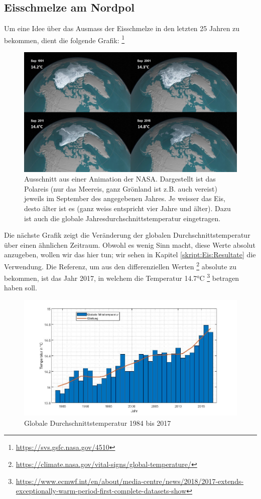 \begin{refsection}
\subsection{Eisschmelze am Nordpol}
Um eine Idee über das Ausmass der Eisschmelze in den letzten 25 Jahren zu bekommen, dient die folgende Grafik:%
	\footnote{\url{https://svs.gsfc.nasa.gov/4510}}
\begin{figure}[H]
	\centering
	\includegraphics[width=14cm]{eis/NASA_ohne_Breitengraden.jpg}
	\caption{Ausschnitt aus einer Animation der NASA. Dargestellt ist das Polareis (nur das Meereis, ganz Grönland ist z.B. auch vereist) jeweils im September des angegebenen Jahres. Je weisser das Eis, desto älter ist es (ganz weiss entspricht vier Jahre und älter).	Dazu ist auch die globale Jahresdurchschnittstemperatur eingetragen.}
	\label{skript:eis:fig:NASAohne}
\end{figure}
Die nächste Grafik zeigt die Veränderung der globalen Durchschnittstemperatur über einen ähnlichen Zeitraum. Obwohl es wenig Sinn macht, diese Werte absolut anzugeben, wollen wir das hier tun; wir sehen in Kapitel \ref{skript:Eis:Resultate} die Verwendung. Die Referenz, um aus den differenziellen Werten \footnote{\url{https://climate.nasa.gov/vital-signs/global-temperature/}} absolute zu bekommen, ist das Jahr 2017, in welchem die Temperatur 14.7°C
\footnote{\url{https://www.ecmwf.int/en/about/media-centre/news/2018/2017-extends-exceptionally-warm-period-first-complete-datasets-show}} betragen haben soll.
\begin{figure}[H]
	\centering
	\includegraphics[width=14cm]{eis/globale_Mitteltemperaturen.jpg}
	\caption{Globale Durchschnittstemperatur 1984 bis 2017}
\end{figure}

\end{refsection}
